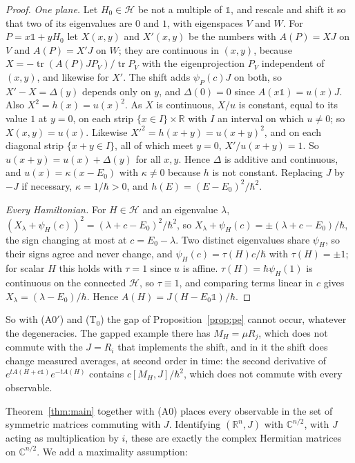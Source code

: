 \documentclass[11pt]{article}
\theoremstyle{remark}
\newcommand{\R}{\mathbb{R}}
\newcommand{\C}{\mathbb{C}}
\newcommand{\one}{\mathbb{1}}
\newcommand{\tr}{\operatorname{tr}}
\begin{document}
\begin{proof}
\emph{One plane.} Let $H_0\in\mathcal{H}$ be not a multiple of $\one$, and rescale and shift it so that two of its eigenvalues are $0$ and $1$, with eigenspaces $V$ and $W$. For $P=x\one+yH_0$ let $X(x,y)$ and $X'(x,y)$ be the numbers with $A(P)=XJ$ on $V$ and $A(P)=X'J$ on $W$; they are continuous in $(x,y)$, because $X=-\tr(A(P)JP_V)/\tr P_V$ with the eigenprojection $P_V$ independent of $(x,y)$, and likewise for $X'$. The shift adds $\psi_P(c)J$ on both, so $X'-X=\Delta(y)$ depends only on $y$, and $\Delta(0)=0$ since $A(x\one)=u(x)J$. Also $X^2=h(x)=u(x)^2$. As $X$ is continuous, $X/u$ is constant, equal to its value $1$ at $y=0$, on each strip $\{x\in I\}\times\R$ with $I$ an interval on which $u\neq0$; so $X(x,y)=u(x)$. Likewise $X'^2=h(x+y)=u(x+y)^2$, and on each diagonal strip $\{x+y\in I\}$, all of which meet $y=0$, $X'/u(x+y)=1$. So $u(x+y)=u(x)+\Delta(y)$ for all $x,y$. Hence $\Delta$ is additive and continuous, and $u(x)=\kappa(x-E_0)$ with $\kappa\neq0$ because $h$ is not constant. Replacing $J$ by $-J$ if necessary, $\kappa=1/\hbar>0$, and $h(E)=(E-E_0)^2/\hbar^2$.

\emph{Every Hamiltonian.} For $H\in\mathcal{H}$ and an eigenvalue $\lambda$, $(X_\lambda+\psi_H(c))^2=(\lambda+c-E_0)^2/\hbar^2$, so $X_\lambda+\psi_H(c)=\pm(\lambda+c-E_0)/\hbar$, the sign changing at most at $c=E_0-\lambda$. Two distinct eigenvalues share $\psi_H$, so their signs agree and never change, and $\psi_H(c)=\tau(H)c/\hbar$ with $\tau(H)=\pm1$; for scalar $H$ this holds with $\tau=1$ since $u$ is affine. $\tau(H)=\hbar\psi_H(1)$ is continuous on the connected $\mathcal{H}$, so $\tau\equiv1$, and comparing terms linear in $c$ gives $X_\lambda=(\lambda-E_0)/\hbar$. Hence $A(H)=J(H-E_0\one)/\hbar$.
\end{proof}

So with (A0$'$) and (T$_0$) the gap of Proposition~\ref{prop:pe} cannot occur, whatever the degeneracies. The gapped example there has $M_H=\mu R_j$, which does not commute with the $J=R_i$ that implements the shift, and in it the shift does change measured averages, at second order in time: the second derivative of $e^{tA(H+c\one)}e^{-tA(H)}$ contains $c[M_H,J]/\hbar^2$, which does not commute with every observable.

Theorem~\ref{thm:main} together with (A0) places every observable in the set of symmetric matrices commuting with $J$. Identifying $(\R^n,J)$ with $\C^{n/2}$, with $J$ acting as multiplication by $i$, these are exactly the complex Hermitian matrices on $\C^{n/2}$. We add a maximality assumption:
\end{document}
